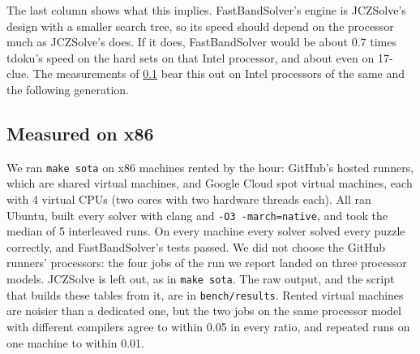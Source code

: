 \documentclass[11pt]{article}
\theoremstyle{definition}
\theoremstyle{plain}
\begin{document}
The last column shows what this implies. FastBandSolver's engine is JCZSolve's design with a smaller search tree, so
its speed should depend on the processor much as JCZSolve's does. If it does, FastBandSolver would be about 0.7 times
tdoku's speed on the hard sets on that Intel processor, and about even on 17-clue. The measurements of
\cref{sec:x86} bear this out on Intel processors of the same and the following generation.

\subsection{Measured on x86}
\label{sec:x86}

We ran \texttt{make sota} on x86 machines rented by the hour: GitHub's hosted runners, which are shared virtual
machines, and Google Cloud spot virtual machines, each with 4 virtual CPUs (two cores with two hardware threads each).
All ran Ubuntu, built every solver with clang and \texttt{-O3 -march=native}, and took the median of 5 interleaved
runs. On every machine every solver solved every puzzle correctly, and FastBandSolver's tests passed. We did not choose
the GitHub runners' processors: the four jobs of the run we report landed on three processor models. JCZSolve is left out, as in
\texttt{make sota}. The raw output, and the script that builds these tables from it, are in \texttt{bench/results}.
Rented virtual machines are noisier than a dedicated one, but the two jobs on the same processor model with different
compilers agree to within 0.05 in every ratio, and repeated runs on one machine to within 0.01.
\end{document}
